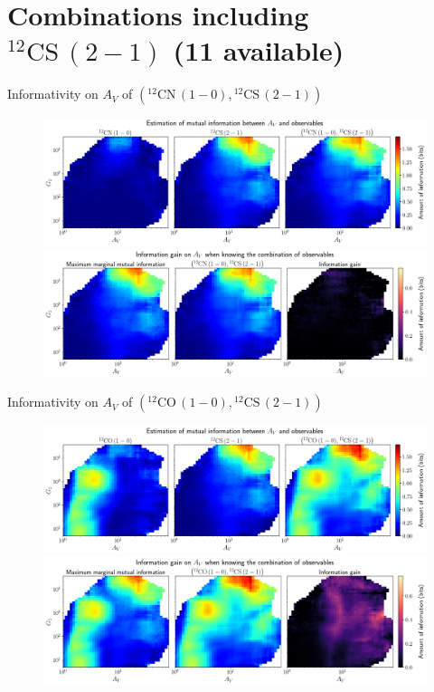 \documentclass{beamer}
\begin{document}
\section{Combinations including $\mathrm{^{12}CS\,(2-1)}$ (11 available)}

\begin{frame}{Informativity on $A_V$ of $\left(\mathrm{^{12}CN\,(1-0)},\mathrm{^{12}CS\,(2-1)}\right)$}
    \begin{figure}
        \centering
        \includegraphics[width=0.95\linewidth]{../mi/av__12cn10_12cs21_mi.png}
        \vfill
        \includegraphics[width=0.95\linewidth]{../mi/av__12cn10_12cs21_mi_gain.png}
    \end{figure}
\end{frame}

\begin{frame}{Informativity on $A_V$ of $\left(\mathrm{^{12}CO\,(1-0)},\mathrm{^{12}CS\,(2-1)}\right)$}
    \begin{figure}
        \centering
        \includegraphics[width=0.95\linewidth]{../mi/av__12co10_12cs21_mi.png}
        \vfill
        \includegraphics[width=0.95\linewidth]{../mi/av__12co10_12cs21_mi_gain.png}
    \end{figure}
\end{frame}
\end{document}
